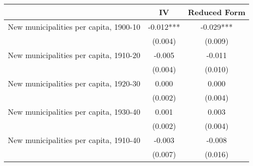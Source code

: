  \begin{tabular}{l*{2}{c}} \toprule
                &\multicolumn{1}{c}{IV}&\multicolumn{1}{c}{Reduced Form}\\
\midrule
New municipalities per capita, 1900-10&   -0.012***&   -0.029***\\
                &  (0.004)   &  (0.009)   \\
\addlinespace
New municipalities per capita, 1910-20&   -0.005   &   -0.011   \\
                &  (0.004)   &  (0.010)   \\
\addlinespace
New municipalities per capita, 1920-30&    0.000   &    0.000   \\
                &  (0.002)   &  (0.004)   \\
\addlinespace
New municipalities per capita, 1930-40&    0.001   &    0.003   \\
                &  (0.002)   &  (0.004)   \\
\addlinespace
New municipalities per capita, 1910-40&   -0.003   &   -0.008   \\
                &  (0.007)   &  (0.016)   \\
 \bottomrule \end{tabular}
